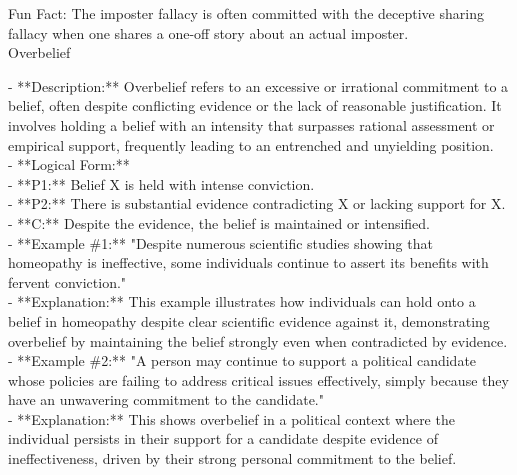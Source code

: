 \documentclass[a4paper,12pt,single,pdftex]{scrbook}
\begin{document}
    
      Fun Fact: The imposter fallacy is often committed with the deceptive sharing fallacy when one shares a one-off story about an actual imposter.
    \\

  

Overbelief
    
      - **Description:** Overbelief refers to an excessive or irrational commitment to a belief, often despite conflicting evidence or the lack of reasonable justification. It involves holding a belief with an intensity that surpasses rational assessment or empirical support, frequently leading to an entrenched and unyielding position.
    \\

    
      - **Logical Form:**
    \\

    
        - **P1:** Belief X is held with intense conviction.
    \\

    
        - **P2:** There is substantial evidence contradicting X or lacking support for X.
    \\

    
        - **C:** Despite the evidence, the belief is maintained or intensified.
    \\

    
      - **Example \#1:** "Despite numerous scientific studies showing that homeopathy is ineffective, some individuals continue to assert its benefits with fervent conviction."
    \\

    
      - **Explanation:** This example illustrates how individuals can hold onto a belief in homeopathy despite clear scientific evidence against it, demonstrating overbelief by maintaining the belief strongly even when contradicted by evidence.
    \\

    
      - **Example \#2:** "A person may continue to support a political candidate whose policies are failing to address critical issues effectively, simply because they have an unwavering commitment to the candidate."
    \\

    
      - **Explanation:** This shows overbelief in a political context where the individual persists in their support for a candidate despite evidence of ineffectiveness, driven by their strong personal commitment to the belief.
    \\
\end{document}
